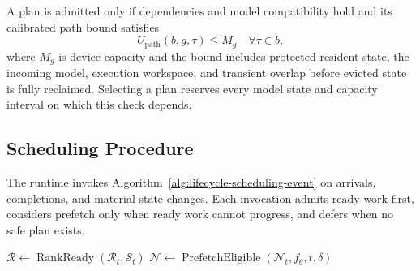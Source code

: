 \documentclass{article}
\begin{document}
A plan is admitted only if dependencies and model compatibility hold and its
calibrated path bound satisfies
\begin{equation}
    U_{\mathrm{path}}(b,g,\tau)\le M_g
    \quad \forall \tau\in b,
    \label{eq:path-memory-safety}
\end{equation}
where $M_g$ is device capacity and the bound includes protected resident state,
the incoming model, execution workspace, and transient overlap before evicted
state is fully reclaimed.
Selecting a plan reserves every model state and capacity interval on which this
check depends.

\subsection{Scheduling Procedure}

The runtime invokes Algorithm~\ref{alg:lifecycle-scheduling-event} on arrivals,
completions, and material state changes. Each invocation admits ready work first,
considers prefetch only when ready work cannot progress, and defers when no safe
plan exists.

\begin{algorithm}[t]
    \caption{Prediction-guided model-lifecycle scheduling.}
    \label{alg:lifecycle-scheduling-event}

    $\mathcal{R} \gets \operatorname{RankReady}(\mathcal{R}_t,\mathcal{S}_t)$\;
    $\mathcal{N}\gets
    \operatorname{PrefetchEligible}(\mathcal{N}_t,f_\theta,t,\delta)$\;
    \;
\end{algorithm}
\end{document}
